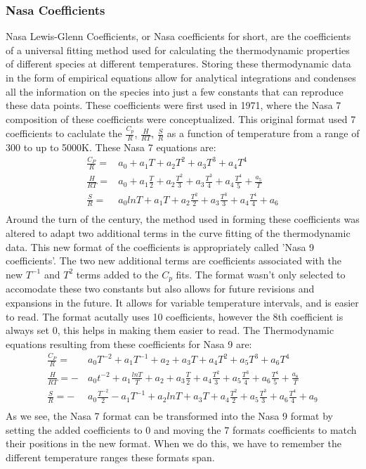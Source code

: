 \documentclass{article}
\newcommand\tab[1][1cm]{\hspace*{#1}}
\begin{document}
\subsubsection{Nasa Coefficients}
\tab Nasa Lewis-Glenn Coefficients, or Nasa coefficients for short, are the coefficients of a universal fitting method used for calculating the thermodynamic properties of different species at different temperatures. Storing these thermodynamic data in the form of empirical equations  allow for analytical integrations and condenses all the information on the species into just a few constants that can reproduce these data points. These coefficients were first used in 1971, where the Nasa 7 composition of these coefficients were conceptualized. This original format used 7 coefficients to caclulate the $\frac{C_p}{R}$, $\frac{H}{RT}$, $\frac{S}{R}$ as a function of temperature from a range of 300 to up to 5000K. These Nasa 7 equations are:
\begin{align*}
 \frac{C_P}{R} =&  a_0+a_1T + a_2T^2 + a_3T^3 + a_4T^4\\
 \frac{H}{RT}  =&  a_0 + a_1\frac{T}{2} + a_2\frac{T^2}{3} + a_3\frac{T^3}{4} + a_4\frac{T^4}{5} + \frac{a_5}{T}\\
 \frac{S}{R} =&   a_0ln{T} + a_1T + a_2\frac{T^{2}}{2} + a_3\frac{T^3}{3} + a_4\frac{T^4}{4} + a_6\\
\end{align*}
Around the turn of the century, the method used in forming these coefficients was altered to adapt two additional terms in the curve fitting of the thermodynamic data. This new format of the coefficients is appropriately called  'Nasa 9 coefficients'. The two new additional terms are coefficients associated with the new $T^{-1}$ and $T^2$ terms added to the $C_p$ fits. The format wasn't only selected to accomodate these two constants but also allows for future revisions and expansions in the future. It allows for variable temperature intervals, and is easier to read. The format acutally uses 10 coefficients, however the 8th coefficient is always set 0, this helps in making them easier to read. The Thermodynamic equations resulting from these coefficients for Nasa 9 are:
\begin{align*}  
  \frac{C_P}{R} = \quad &a_0T^{-2} + a_1T^{-1} + a_2+a_3T + a_4T^2 + a_5T^3 + a_6T^4\\
  \frac{H}{RT} = -&a_0t^{-2} + a_1\frac{ln{T}}{T} + a_2 + a_3\frac{T}{2} + a_4\frac{T^2}{3} + a_5\frac{T^3}{4} + a_6\frac{T^4}{5} + \frac{a_8}{T}\\
  \frac{S}{R} =  -&a_0\frac{T^{-2}}{2} - a_1T^{-1} + a_2ln{T} + a_3T + a_4\frac{T^{2}}{2} + a_5\frac{T^3}{3} + a_6\frac{T^4}{4} + a_9\\
\end{align*}
As we see, the Nasa 7 format can be transformed into the Nasa 9 format by setting the added coefficients to 0 and moving the 7 formats coefficients to match their positions in the new format. When we do this, we have to remember the different temperature ranges these formats span. 
\end{document}
